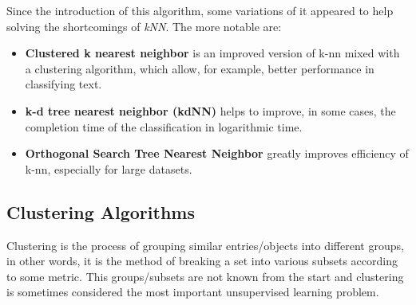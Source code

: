Since the introduction of this algorithm, some variations of it appeared to help
solving the shortcomings of \emph{kNN}.\cite{DBLP:journals/corr/abs-1007-0085}
The more notable are:
\begin{itemize}
\item \textbf{Clustered k nearest neighbor} \cite{journals/jcp/ZhouLX09} is an improved version of k-nn mixed with a clustering algorithm, which allow, for example, 
better performance in classifying text.
\item \textbf{k-d tree nearest neighbor (kdNN)} \cite{Sproull1991} helps to improve, in some cases, the completion time of the classification in logarithmic time.
\item \textbf{Orthogonal Search Tree Nearest Neighbor} \cite{955110} greatly improves efficiency of k-nn, especially for large datasets.
\end{itemize}

\subsection{Clustering Algorithms}\label{sec:clust}

Clustering is the process of grouping similar entries/objects into different groups, in other words, it is the method of breaking a set into various subsets according to some
metric. This groups/subsets are not known from the start and clustering is sometimes considered the most important unsupervised learning problem\cite{DBLP:journals/corr/abs-1205-1117}.

